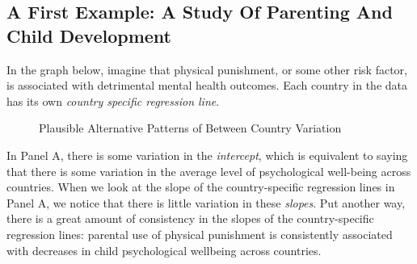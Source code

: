 \documentclass[
  letterpaper,
  DIV=11,
  numbers=noendperiod]{scrreprt}
\begin{document}
\subsection{A First Example: A Study Of Parenting And Child
Development}\label{a-first-example-a-study-of-parenting-and-child-development}

In the graph below, imagine that physical punishment, or some other risk
factor, is associated with detrimental mental health outcomes. Each
country in the data has its own \emph{country specific regression line}.

\begin{figure}


\caption{\label{fig-variation1}Plausible Alternative Patterns of Between
Country Variation}

\end{figure}%

In Panel A, there is some variation in the \emph{intercept}, which is
equivalent to saying that there is some variation in the average level
of psychological well-being across countries. When we look at the slope
of the country-specific regression lines in Panel A, we notice that
there is little variation in these \emph{slopes}. Put another way, there
is a great amount of consistency in the slopes of the country-specific
regression lines: parental use of physical punishment is consistently
associated with decreases in child psychological wellbeing across
countries.
\end{document}
